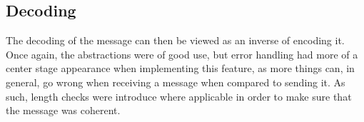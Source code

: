 \documentclass[a4paper, titlepage,12pt]{article}
\begin{document}
\subsection{Decoding}
		The decoding of the message can then be viewed as an inverse of encoding it. Once again, the abstractions were of good use, but error handling had more of a center stage appearance when implementing this feature, as more things can, in general, go wrong when receiving a message when compared to sending it. As such, length checks were introduce where applicable in order to make sure that the message was coherent.

\newpage
	\printbibliography
\end{document}
